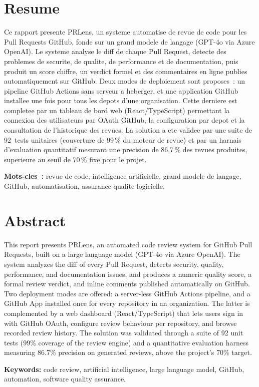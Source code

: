 \documentclass[a4paper,12pt,oneside]{report}
\begin{document}
\begin{appendices}
\end{appendices}

\chapter*{Resume}

Ce rapport presente PRLens, un systeme automatise de revue de code pour les Pull Requests GitHub, fonde sur un grand modele de langage (GPT-4o via Azure OpenAI). Le systeme analyse le diff de chaque Pull Request, detecte des problemes de securite, de qualite, de performance et de documentation, puis produit un score chiffre, un verdict formel et des commentaires en ligne publies automatiquement sur GitHub. Deux modes de deploiement sont proposes~: un pipeline GitHub Actions sans serveur a heberger, et une application GitHub installee une fois pour tous les depots d'une organisation. Cette derniere est completee par un tableau de bord web (React/TypeScript) permettant la connexion des utilisateurs par OAuth GitHub, la configuration par depot et la consultation de l'historique des revues. La solution a ete validee par une suite de 92~tests unitaires (couverture de 99\,\% du moteur de revue) et par un harnais d'evaluation quantitatif mesurant une precision de 86,7\,\% des revues produites, superieure au seuil de 70\,\% fixe pour le projet.

\vspace{0.5cm}
\noindent\textbf{Mots-cles~:} revue de code, intelligence artificielle, grand modele de langage, GitHub, automatisation, assurance qualite logicielle.

\chapter*{Abstract}

This report presents PRLens, an automated code review system for GitHub Pull Requests, built on a large language model (GPT-4o via Azure OpenAI). The system analyzes the diff of every Pull Request, detects security, quality, performance, and documentation issues, and produces a numeric quality score, a formal review verdict, and inline comments published automatically on GitHub. Two deployment modes are offered: a server-less GitHub Actions pipeline, and a GitHub App installed once for every repository in an organization. The latter is complemented by a web dashboard (React/TypeScript) that lets users sign in with GitHub OAuth, configure review behaviour per repository, and browse recorded review history. The solution was validated through a suite of 92 unit tests (99\% coverage of the review engine) and a quantitative evaluation harness measuring 86.7\% precision on generated reviews, above the project's 70\% target.

\vspace{0.5cm}
\noindent\textbf{Keywords:} code review, artificial intelligence, large language model, GitHub, automation, software quality assurance.
\end{document}
